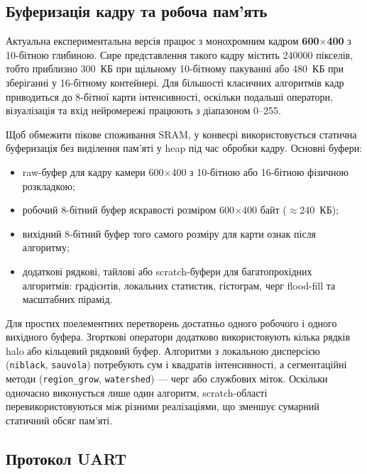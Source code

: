 \documentclass[a4paper,12pt]{article}
\begin{document}
\subsection{Буферизація кадру та робоча пам'ять}

Актуальна експериментальна версія працює з монохромним кадром \textbf{600$\times$400} з 10-бітною глибиною. Сире представлення такого кадру містить 240000 пікселів, тобто приблизно 300~КБ при щільному 10-бітному пакуванні або 480~КБ при зберіганні у 16-бітному контейнері. Для більшості класичних алгоритмів кадр приводиться до 8-бітної карти інтенсивності, оскільки подальші оператори, візуалізація та вхід нейромережі працюють з діапазоном 0--255.

Щоб обмежити пікове споживання SRAM, у конвеєрі використовується статична буферизація без виділення пам'яті у heap під час обробки кадру. Основні буфери:
\begin{itemize}
	\item raw-буфер для кадру камери 600$\times$400 з 10-бітною або 16-бітною фізичною розкладкою;
	\item робочий 8-бітний буфер яскравості розміром 600$\times$400 байт ($\approx$240~КБ);
	\item вихідний 8-бітний буфер того самого розміру для карти ознак після алгоритму;
	\item додаткові рядкові, тайлові або scratch-буфери для багатопрохідних алгоритмів: градієнтів, локальних статистик, гістограм, черг flood-fill та масштабних пірамід.
\end{itemize}

Для простих поелементних перетворень достатньо одного робочого і одного вихідного буфера. Згорткові оператори додатково використовують кілька рядків halo або кільцевий рядковий буфер. Алгоритми з локальною дисперсією (\texttt{niblack}, \texttt{sauvola}) потребують сум і квадратів інтенсивності, а сегментаційні методи (\texttt{region\_grow}, \texttt{watershed}) --- черг або службових міток. Оскільки одночасно виконується лише один алгоритм, scratch-області перевикористовуються між різними реалізаціями, що зменшує сумарний статичний обсяг пам'яті.

\subsection{Протокол UART}
\end{document}
